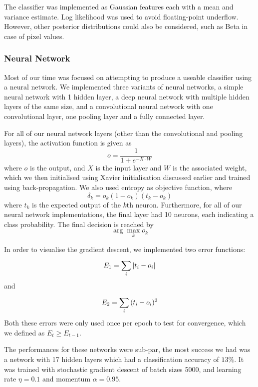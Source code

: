 \documentclass{article} %
\begin{document}
The classifier was implemented as Gaussian features each with a mean and variance estimate. Log likelihood was used to avoid floating-point underflow. However, other posterior distributions could also be considered, such as Beta in case of pixel values.

\subsubsection{Neural Network}
Most of our time was focused on attempting to produce a useable classifier using a neural network. We implemented three variants of neural networks, a simple neural network with 1 hidden layer, a deep neural network with multiple hidden layers of the same size, and a convolutional neural network with one convolutional layer, one pooling layer and a fully connected layer.

For all of our neural network layers (other than the convolutional and pooling layers), the activation function is given as
$$o = \frac{1}{1+e^{-X\cdot W}}$$
where $o$ is the output, and $X$ is the input layer and $W$ is the associated weight, which we then initialised using Xavier initialisation discussed earlier and trained using back-propagation.
We also used entropy as objective function, where
$$\delta_k = o_k(1-o_k)(t_k-o_k)$$
where $t_k$ is the expected output of the $k$th neuron. Furthermore, for all of our neural network implementations, the final layer had 10 neurons, each indicating a class probability. The final decision is reached by 
$$\arg\max_k o_k$$

In order to visualise the gradient descent, we implemented two error functions:
  $$E_1 = \sum^{}_{i}{|t_i-o_i|}$$
and
  $$E_2 = \sum^{}_{i}{(t_i-o_i)^2}$$
Both these errors were only used once per epoch to test for convergence, which we defined as $E_{t}\geq E_{t-1}$.

The performances for these networks were sub-par, the most success we had was a network with 17 hidden layers which had a classification accuracy of $13\%$. It was trained with stochastic gradient descent of batch sizes 5000, and learning rate $\eta=0.1$ and momentum $\alpha=0.95$.
\end{document}
